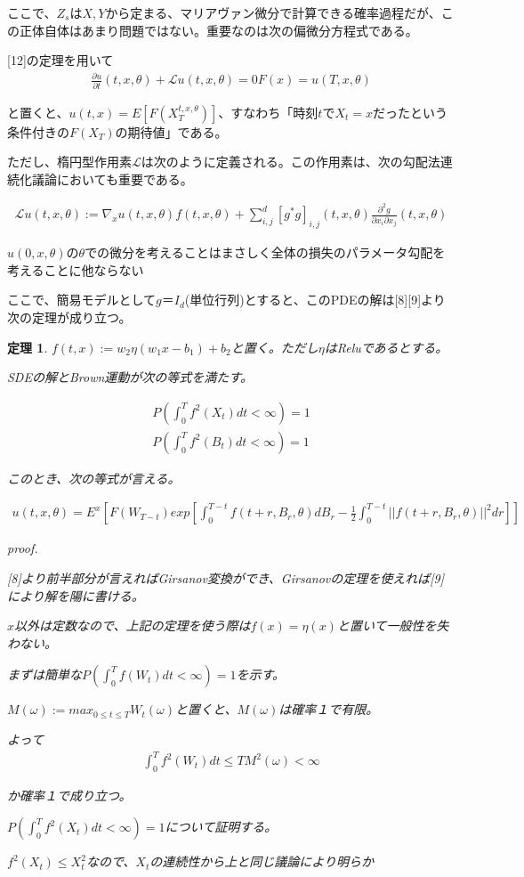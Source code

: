 \documentclass{jsarticle}
\newtheorem{theo}{定理}[section]
\begin{document}
ここで、$Z_s$は$X,Y$から定まる、マリアヴァン微分で計算できる確率過程だが、この正体自体はあまり問題ではない。重要なのは次の偏微分方程式である。

[12]の定理を用いて
\begin{align}
\frac{\partial u}{\partial t}(t,x,\theta)+\mathcal{L}u(t,x,\theta)=0
F(x)=u(T,x,\theta)
\end{align}


と置くと、$u(t,x)=E[F(X^{t,x,\theta}_T)]$、すなわち「時刻$t$で$X_t=x$だったという条件付きの$F(X_T)$の期待値」である。

ただし、楕円型作用素$\mathcal{L}$は次のように定義される。この作用素は、次の勾配法連続化議論においても重要である。

\begin{align}
\mathcal{L}u(t,x,\theta):=\nabla_x u(t,x,\theta) f(t,x,\theta)+\sum^d_{i,j} [g^*g]_{i,j}(t,x,\theta)\frac{\partial^2 g}{\partial x_i\partial x_j}(t,x,\theta)
\end{align}


$u(0,x,\theta)$の$\theta$での微分を考えることはまさしく全体の損失のパラメータ勾配を考えることに他ならない

ここで、簡易モデルとして$g＝I_d$(単位行列)とすると、このPDEの解は[8][9]より次の定理が成り立つ。

\begin{theo}

$f(t,x):=w_2\eta(w_1 x-b_1)+b_2$と置く。ただし$\eta$はReluであるとする。

SDEの解とBrown運動が次の等式を満たす。

\begin{align}
P(\int^T_0f^2(X_t)dt<\infty)=1 \\
P(\int^T_0f^2(B_t)dt<\infty)=1 
\end{align}

このとき、次の等式が言える。

\begin{align}
u(t,x,\theta)=E^x[F(W_{T-t})exp[\int_0^{T-t} f(t+r,B_r,\theta)dB_r-\frac{1}{2} \int^{T-t}_0||f(t+r,B_r,\theta)||^2dr]]
\end{align}


proof.

[8]より前半部分が言えればGirsanov変換ができ、Girsanovの定理を使えれば[9]により解を陽に書ける。



$x$以外は定数なので、上記の定理を使う際は$f(x)=\eta(x)$と置いて一般性を失わない。

まずは簡単な$P(\int^T_0f(W_t)dt<\infty)=1 $を示す。

$M(\omega):=max_{0\leq t \leq T}W_t(\omega)$と置くと、$M(\omega)$は確率１で有限。

よって
\begin{align}
\int^T_0f^2(W_t)dt\leq T M^2(\omega)<\infty
\end{align}

か確率１で成り立つ。

$P(\int^T_0f^2(X_t)dt<\infty)=1$について証明する。

$f^2(X_t)\leq X^2_t$なので、$X_t$の連続性から上と同じ議論により明らか


\end{theo}
\end{document}
